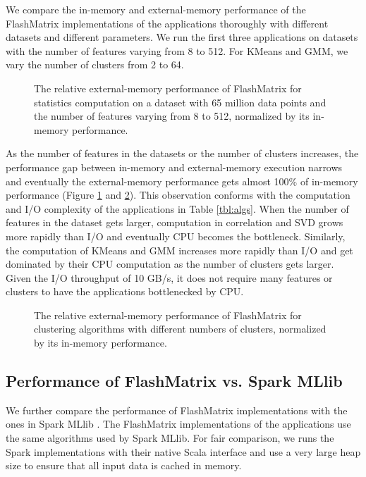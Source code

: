 We compare the in-memory and external-memory performance of the FlashMatrix
implementations of the applications thoroughly with different datasets and
different parameters. We run the first three applications on datasets with
the number of features varying from 8 to 512. For KMeans and GMM, we vary
the number of clusters from 2 to 64.

\begin{figure}
	\begin{center}
		\footnotesize
		
		\caption{The relative external-memory performance of FlashMatrix for
			statistics computation on a dataset with 65 million data points
			and the number of features varying from 8 to 512, normalized by
		its in-memory performance.}
		\label{perf:stat}
	\end{center}
\end{figure}

As the number of features in the datasets or the number of clusters increases,
the performance gap between in-memory and external-memory execution
narrows and eventually the external-memory performance gets almost 100\%
of in-memory performance (Figure \ref{perf:stat} and \ref{perf:clust}).
This observation conforms with the computation and I/O complexity of
the applications in Table \ref{tbl:algs}. When the number of features
in the dataset gets larger, computation in correlation and SVD grows more
rapidly than I/O and eventually CPU becomes
the bottleneck. Similarly, the computation of KMeans and GMM increases
more rapidly than I/O and get dominated by their CPU computation as the number
of clusters gets larger. Given the I/O throughput of 10 GB/s, it does not
require many features or clusters to have the applications bottlenecked by
CPU.

\begin{figure}
	\begin{center}
		\footnotesize
		
		\caption{The relative external-memory performance of FlashMatrix for
			clustering algorithms with different numbers of clusters, normalized
		by its in-memory performance.}
		\label{perf:clust}
	\end{center}
\end{figure}

\subsection{Performance of FlashMatrix vs. Spark MLlib}

We further compare the performance of FlashMatrix implementations with the ones
in Spark MLlib \cite{mllib}. The FlashMatrix implementations of the applications
use the same algorithms used by Spark MLlib. For fair comparison, we runs the Spark
implementations with their native Scala interface and use a very large heap size
to ensure that all input data is cached in memory.

